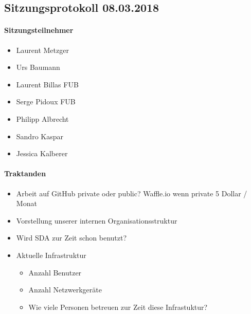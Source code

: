 \newpage






\subsection{Sitzungsprotokoll 08.03.2018}

\paragraph{Sitzungsteilnehmer}
\begin{itemize}	
	\item Laurent Metzger 
	\item Urs Baumann
	\item Laurent Billas FUB
	\item Serge Pidoux FUB
	\item Philipp Albrecht
	\item Sandro Kaspar
	\item Jessica Kalberer
\end{itemize}

\paragraph{Traktanden}
\begin{itemize}	
	\item Arbeit auf GitHub private oder public? Waffle.io wenn private 5 Dollar / Monat
	\item Vorstellung unserer internen Organisationsstruktur
	\item Wird SDA zur Zeit schon benutzt?
	\item Aktuelle Infrastruktur
	\begin{itemize}
		\item Anzahl Benutzer
		\item Anzahl Netzwerkgeräte
		\item Wie viele Personen betreuen zur Zeit diese Infrastuktur? 
	\end{itemize}
\end{itemize}

